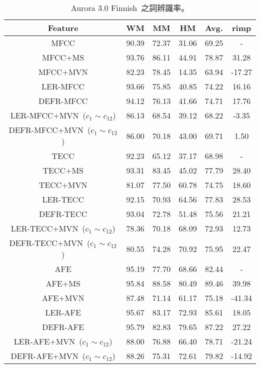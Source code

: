 \begin{table}[!htb]
\renewcommand{\arraystretch}{1.1}
\centering
\caption{Aurora 3.0 Finnish~之詞辨識率。}
\label{table:aurora3_finnish}  
\vspace{2mm}
\begin{tabular}{c|ccc|c|c}
\hline 
Feature & WM & MM & HM & Avg. & rimp  \\ 
\hline \hline
{MFCC} & 90.39  & 72.37  & 31.06  & 69.25 & -\\
{MFCC+MS} & 93.76  & 86.11  & 44.91   & 78.87 & 31.28\\
{MFCC+MVN} & 82.23  & 78.45  & 14.35   & 63.94 & -17.27\\
{LER-MFCC} & 93.66  & 75.85  & 40.85   & 74.22 & 16.16\\
{DEFR-MFCC} & 94.12  & 76.13  & 41.66   & 74.71 & 17.76\\
{LER-MFCC+MVN~($c_1 \sim c_{12}$)} & 86.13  & 68.54  & 39.12   & 68.22 & -3.35\\
{DEFR-MFCC}+MVN~($c_1 \sim c_{12}$) & 86.00  & 70.18  & 43.00  & 69.71 & 1.50\\
\hline
{TECC} & 92.23  & 65.12  & 37.17   & 68.98 & -\\
{TECC+MS} & 93.31  & 83.45  & 45.02   & 77.79 & 28.40\\
{TECC+MVN} & 81.07  & 77.50  & 60.78   & 74.75 & 18.60\\
{LER-TECC} & 92.15  & 70.93  & 64.56   & 77.83 & 28.53\\
{DEFR-TECC} & 93.04  & 72.78  & 51.48   & 75.56 & 21.21\\
{LER-TECC+MVN~($c_1 \sim c_{12}$)} & 78.36  & 70.18  & 68.09   & 72.93 & 12.73\\
{DEFR-TECC+MVN~($c_1 \sim c_{12}$)} & 80.55  & 74.28  & 70.92   & 75.95 & 22.47\\
\hline
{AFE} & 95.19  & 77.70  & 68.66   & 82.44 & -\\
{AFE+MS} & 95.84  & 88.58  & 80.49   &  89.46 & 39.98\\
{AFE+MVN} & 87.48  & 71.14  & 61.17   & 75.18 & -41.34\\
{LER-AFE} & 95.67  & 83.17  & 72.93   & 85.61 & 18.05\\
{DEFR-AFE} & 95.79  & 82.83  & 79.65   & 87.22 & 27.22\\
{LER-AFE+MVN~($c_1 \sim c_{12}$)} & 88.00  & 76.88  & 66.40   & 78.71 & -21.24\\
{DEFR-AFE+MVN~($c_1 \sim c_{12}$)} & 88.26  & 75.31  & 72.61   & 79.82 & -14.92\\
\hline
\end{tabular}
\end{table}

